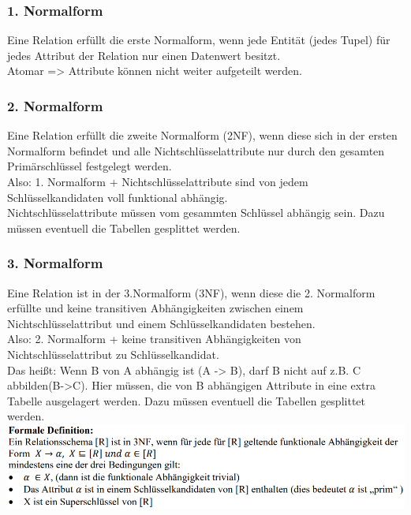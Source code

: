 \documentclass[12pt,a4paper]{article}
\begin{document}
	\subsubsection{1. Normalform}
		Eine Relation erfüllt die erste Normalform, wenn jede Entität (jedes Tupel) für jedes Attribut der Relation nur einen Datenwert besitzt.\\
		Atomar => Attribute können nicht weiter aufgeteilt werden.

	\subsubsection{2. Normalform}
		Eine Relation erfüllt die zweite Normalform (2NF), wenn diese sich in der ersten Normalform befindet und alle Nichtschlüsselattribute nur durch den gesamten Primärschlüssel festgelegt werden.\\
		Also: 1. Normalform + Nichtschlüsselattribute sind von jedem Schlüsselkandidaten voll funktional abhängig.\\
		Nichtschlüsselattribute müssen vom gesammten Schlüssel abhängig sein. Dazu müssen eventuell die Tabellen gesplittet werden.

	\subsubsection{3. Normalform}
		Eine Relation ist in der 3.Normalform (3NF), wenn diese die 2. Normalform erfüllte und keine transitiven Abhängigkeiten zwischen einem Nichtschlüsselattribut und einem Schlüsselkandidaten bestehen.\\
		Also: 2. Normalform + keine transitiven Abhängigkeiten von Nichtschlüsselattribut zu Schlüsselkandidat.\\
		Das heißt: Wenn B von A abhängig ist (A -> B), darf B nicht auf z.B. C abbilden(B->C). Hier müssen, die von B abhängigen Attribute in eine extra Tabelle ausgelagert werden. Dazu müssen eventuell die Tabellen gesplittet werden.\\
		\includegraphics[width=\textwidth]{Bilder/3_nf.PNG}
\end{document}
